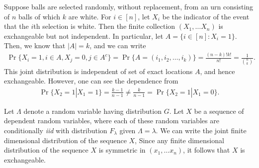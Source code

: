 \documentclass[a4paper,english,10pt]{article}
\begin{document}
\begin{shaded*}
\begin{exmp}
Suppose balls are selected randomly, without replacement, from an urn consisting of $n$ balls of which $k$ are white. 
For $i \in [n]$, let $X_i$ be the indicator of the event that the $i$th selection is white. 
Then the finite collection $(X_1, \ldots X_n)$ is exchangeable but not independent. 
In particular, let $A = \{ i \in [n]: X_i = 1\}$. 
Then, we know that $|A| = k$, 
and we can write 
\begin{align*}
\Pr\{X_i = 1, i \in A, X_j = 0, j \in A^c\} = \Pr\{A = (i_1, i_2, \ldots, i_k) \} = \frac{(n-k)!k!}{n!} = \frac{1}{\binom{n}{k}}.
\end{align*}
This joint distribution is independent of set of exact locations $A$, and hence exchangeable. 
However, one can see the dependence from 
\begin{align*}
\Pr\{X_2 = 1|X_1= 1\} = \frac{k-1}{n-1} \neq \frac{k}{n-1} = \Pr\{X_2 = 1|X_1 =0\}.
\end{align*}
\end{exmp}
\begin{exmp}
Let $\Lambda$ denote a random variable having distribution $G$. 
Let $X$ be a sequence of dependent random variables, 
where each of these random variables are conditionally \textit{iid} with distribution $F_\lambda$ given $\Lambda= \lambda$. 
We can write the joint finite dimensional distribution of the sequence $X$, 
Since any finite dimensional distribution of the sequence $X$ is symmetric in $(x_1, \ldots x_n)$, 
it follows that $X$ is exchangeable. %
\end{exmp}
\end{shaded*}
\end{document}
